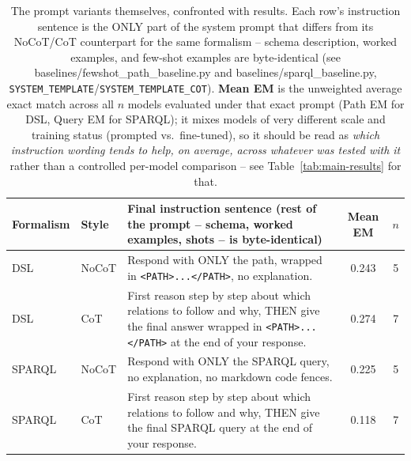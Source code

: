 \begin{table}[t]
\centering
\small
\begin{tabular}{l l p{7.2cm} c c}
\toprule
\textbf{Formalism} & \textbf{Style} & \textbf{Final instruction sentence (rest of the prompt -- schema, worked examples, shots -- is byte-identical)} & \textbf{Mean EM} & $n$ \\
\midrule
DSL & NoCoT & Respond with ONLY the path, wrapped in \texttt{<PATH>...</PATH>}, no explanation. & 0.243 & 5 \\
DSL & CoT & First reason step by step about which relations to follow and why, THEN give the final answer wrapped in \texttt{<PATH>...</PATH>} at the end of your response. & 0.274 & 7 \\
SPARQL & NoCoT & Respond with ONLY the SPARQL query, no explanation, no markdown code fences. & 0.225 & 5 \\
SPARQL & CoT & First reason step by step about which relations to follow and why, THEN give the final SPARQL query at the end of your response. & 0.118 & 7 \\
\bottomrule
\end{tabular}
\caption{The prompt variants themselves, confronted with results. Each row's instruction sentence is the ONLY part of the system prompt that differs from its NoCoT/CoT counterpart for the same formalism -- schema description, worked examples, and few-shot examples are byte-identical (see baselines/fewshot\_path\_baseline.py and baselines/sparql\_baseline.py, \texttt{SYSTEM\_TEMPLATE}/\texttt{SYSTEM\_TEMPLATE\_COT}). \textbf{Mean EM} is the unweighted average exact match across all $n$ models evaluated under that exact prompt (Path EM for DSL, Query EM for SPARQL); it mixes models of very different scale and training status (prompted vs.\ fine-tuned), so it should be read as \emph{which instruction wording tends to help, on average, across whatever was tested with it} rather than a controlled per-model comparison -- see Table~\ref{tab:main-results} for that.}
\label{tab:prompt-variants}
\end{table}
